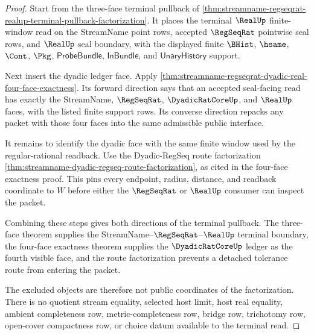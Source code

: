 \begin{proof}
Start from the three-face terminal pullback of
\autoref{thm:streamname-regseqrat-realup-terminal-pullback-factorization}. It
places the terminal $\RealUp$ finite-window read on the StreamName point rows,
accepted $\RegSeqRat$ pointwise seal rows, and $\RealUp$ seal boundary, with
the displayed finite $\BHist$, $\hsame$, $\Cont$, $\Pkg$,
$\mathsf{ProbeBundle}$, $\mathsf{InBundle}$, and $\mathsf{UnaryHistory}$
support.

Next insert the dyadic ledger face. Apply
\autoref{thm:streamname-regseqrat-dyadic-real-four-face-exactness}. Its
forward direction says that an accepted seal-facing read has exactly the
StreamName, $\RegSeqRat$, $\DyadicRatCoreUp$, and $\RealUp$ faces, with the
listed finite support rows. Its converse direction repacks any packet with
those four faces into the same admissible public interface.

It remains to identify the dyadic face with the same finite window used by the
regular-rational readback. Use the Dyadic-RegSeq route factorization
\autoref{thm:streamname-dyadic-regseq-route-factorization}, as cited in the
four-face exactness proof. This pins every endpoint, radius, distance, and
readback coordinate to $W$ before either the $\RegSeqRat$ or $\RealUp$
consumer can inspect the packet.

Combining these steps gives both directions of the terminal pullback. The
three-face theorem supplies the StreamName--$\RegSeqRat$--$\RealUp$ terminal
boundary, the four-face exactness theorem supplies the
$\DyadicRatCoreUp$ ledger as the fourth visible face, and the route
factorization prevents a detached tolerance route from entering the packet.

The excluded objects are therefore not public coordinates of the factorization.
There is no quotient stream equality, selected host limit, host real equality,
ambient completeness row, metric-completeness row, bridge row, trichotomy row,
open-cover compactness row, or choice datum available to the terminal read.
\end{proof}

